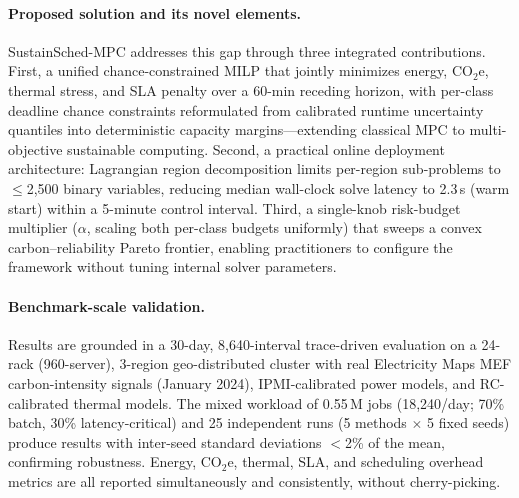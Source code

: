 \documentclass[a4paper,fleqn]{cas-dc}
\begin{document}
\paragraph{Proposed solution and its novel elements.}
SustainSched-MPC addresses this gap through three integrated contributions. First, a unified chance-constrained MILP that jointly minimizes energy, CO$_2$e, thermal stress, and SLA penalty over a 60-min receding horizon, with per-class deadline chance constraints reformulated from calibrated runtime uncertainty quantiles into deterministic capacity margins---extending classical MPC to multi-objective sustainable computing. Second, a practical online deployment architecture: Lagrangian region decomposition limits per-region sub-problems to $\leq$2,500 binary variables, reducing median wall-clock solve latency to 2.3\,s (warm start) within a 5-minute control interval. Third, a single-knob risk-budget multiplier ($\alpha$, scaling both per-class budgets uniformly) that sweeps a convex carbon--reliability Pareto frontier, enabling practitioners to configure the framework without tuning internal solver parameters.

\paragraph{Benchmark-scale validation.}
Results are grounded in a 30-day, 8,640-interval trace-driven evaluation on a 24-rack (960-server), 3-region geo-distributed cluster with real Electricity Maps MEF carbon-intensity signals (January 2024), IPMI-calibrated power models, and RC-calibrated thermal models. The mixed workload of 0.55\,M jobs (18,240/day; 70\% batch, 30\% latency-critical) and 25 independent runs (5 methods $\times$ 5 fixed seeds) produce results with inter-seed standard deviations $<$2\% of the mean, confirming robustness. Energy, CO$_2$e, thermal, SLA, and scheduling overhead metrics are all reported simultaneously and consistently, without cherry-picking.
\end{document}
